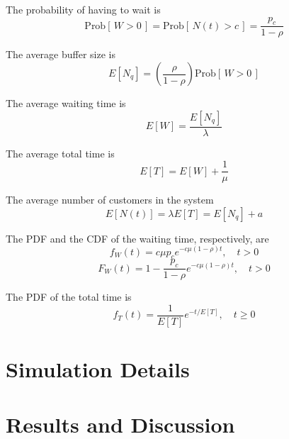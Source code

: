 \documentclass[12pt, a4paper]{article}
\begin{document}
The probability of having to wait is 
\begin{equation}
  \text{Prob}[\, W > 0 \,] = \text{Prob}[\, N(t) > c \,]
  = \frac{p_c}{1 - \rho}
\end{equation}

The average buffer size is 
\begin{equation}
  E[N_q] = \left( \frac{\rho}{1 - \rho} \right) \text{Prob}
  [\, W > 0 \,]
\end{equation}

The average waiting time is 
\begin{equation}
  E[W] =\frac{E[N_q]}{\lambda}
\end{equation}

The average total time is 
\begin{equation}
  E[T] = E[W] + \frac{1}{\mu}
\end{equation}

The average number of customers in the system 
\begin{equation}
  E[N(t)] = \lambda E[T] = E[N_q] + a  
\end{equation}

The PDF and the CDF of the waiting time, respectively, are 
\begin{equation}
  f_W(t) = c \mu p_c e^{-c \mu \left( 1 - \rho \right)t}, \quad t > 0
\end{equation}
\begin{equation}
  F_W(t) = 1 - \frac{p_c}{1 - \rho} e^{-c \mu \left( 1 - \rho \right)t}, \quad t > 0
\end{equation}

The PDF of the total time is 
\begin{equation}
  f_T(t) = \frac{1}{E[T]} e^{- t/ E[T] }, \quad t \ge 0 
\end{equation}

\section*{Simulation Details}

\section*{Results and Discussion}
\end{document}
